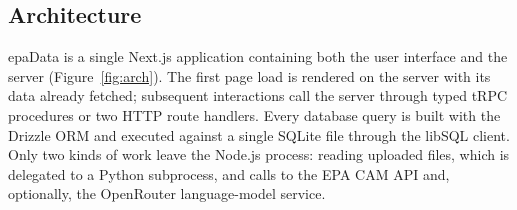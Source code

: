 \documentclass[11pt,a4paper]{article}
\begin{document}
\subsection{Architecture}

epaData is a single Next.js application containing both the user interface and the server
(Figure~\ref{fig:arch}). The first page load is rendered on the server with its data already
fetched; subsequent interactions call the server through typed tRPC procedures or two HTTP
route handlers. Every database query is built with the Drizzle ORM and executed against a
single SQLite file through the libSQL client. Only two kinds of work leave the Node.js process:
reading uploaded files, which is delegated to a Python subprocess, and calls to the EPA CAM API
and, optionally, the OpenRouter language-model service.
\end{document}
